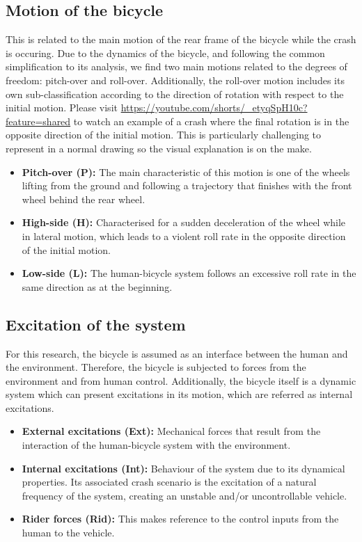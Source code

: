 \documentclass{article}
\begin{document}
\subsection{Motion of the bicycle}

This is related to the main motion of the rear frame of the bicycle while the crash is occuring.
%
Due to the dynamics of the bicycle, and following the common simplification to its analysis, we find two main motions related to the degrees of freedom: pitch-over and roll-over.
%
Additionally, the roll-over motion includes its own sub-classification according to the direction of rotation with respect to the initial motion.
% 
Please visit \url{https://youtube.com/shorts/_etyqSpH10c?feature=shared} to watch an example of a crash where the final rotation is in the opposite direction of the initial motion.
%
This is particularly challenging to represent in a normal drawing so the visual explanation is on the make.

\begin{itemize}
    \item \textbf{Pitch-over (P):} The main characteristic of this motion is one of the wheels lifting from the ground and following a trajectory that finishes with the front wheel behind the rear wheel.
    \item \textbf{High-side (H):} Characterised for a sudden deceleration of the wheel while in lateral motion, which leads to a violent roll rate in the opposite direction of the initial motion.
    \item \textbf{Low-side (L):} The human-bicycle system follows an excessive roll rate in the same direction as at the beginning.
\end{itemize}

\subsection{Excitation of the system}

For this research, the bicycle is assumed as an interface between the human and the environment.
%
Therefore, the bicycle is subjected to forces from the environment and from human control.
%
Additionally, the bicycle itself is a dynamic system which can present excitations in its motion, which are referred as internal excitations.


\begin{itemize}
    \item \textbf{External excitations (Ext):} Mechanical forces that result from the interaction of the human-bicycle system with the environment.
    \item \textbf{Internal excitations (Int):} Behaviour of the system due to its dynamical properties.
        Its associated crash scenario is the excitation of a natural frequency of the system, creating an unstable and/or uncontrollable vehicle.
    \item \textbf{Rider forces (Rid):} This makes reference to the control inputs from the human to the vehicle.
\end{itemize}
\end{document}
